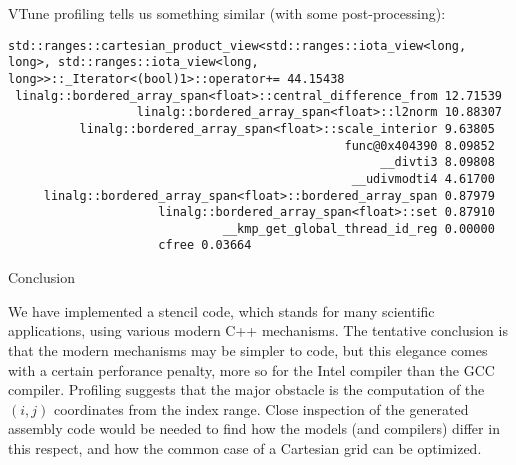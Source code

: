 VTune profiling tells us something similar
(with some post-processing):
\begin{lstlisting}[language=verbatim]
std::ranges::cartesian_product_view<std::ranges::iota_view<long, long>, std::ranges::iota_view<long, long>>::_Iterator<(bool)1>::operator+= 44.15438
 linalg::bordered_array_span<float>::central_difference_from 12.71539
                  linalg::bordered_array_span<float>::l2norm 10.88307
          linalg::bordered_array_span<float>::scale_interior 9.63805
                                               func@0x404390 8.09852
                                                    __divti3 8.09808
                                                __udivmodti4 4.61700
     linalg::bordered_array_span<float>::bordered_array_span 0.87979
                     linalg::bordered_array_span<float>::set 0.87910
                              __kmp_get_global_thread_id_reg 0.00000
                     cfree 0.03664
\end{lstlisting}

 {Conclusion}

We have implemented a stencil code, which stands for many scientific applications,
using various modern C++ mechanisms.
The tentative conclusion is that the modern mechanisms may be simpler to code,
but this elegance comes with a certain perforance penalty,
more so for the Intel compiler than the GCC compiler.
Profiling suggests that the major obstacle is the computation
of the $(i,j)$ coordinates from the index range.
Close inspection of the generated assembly code
would be needed to find how the models (and compilers)
differ in this respect, and how the common case
of a Cartesian grid can be optimized.

\endinput


First of all we remark that ranging over data:
\begin{multicols}{2}
\begin{lstlisting}
#pragma omp parallel for 
for ( int i=0; i<x.size(); ++i )
  x[i] = f(i);
\end{lstlisting}
\columnbreak
\begin{lstlisting}
#pragma omp parallel for 
for ( auto& [i,e] : 
        x | rv::enumerate )
  e = f(i);
\end{lstlisting}
\end{multicols}
comes with zero performance penalty.

There are also `execution policies' but at the high core counts common in HPC,
these can be dramatically worse than using OpenMP.

